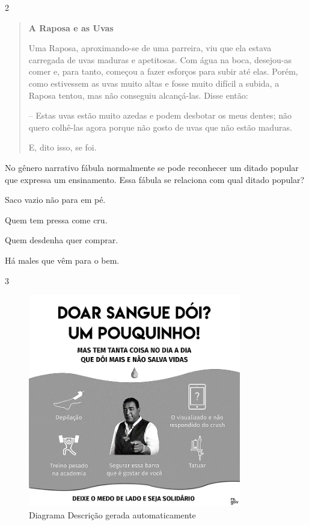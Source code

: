 \num{2}

\begin{quote}
\textbf{A Raposa e as Uvas}

Uma Raposa, aproximando-se de uma parreira, viu que ela estava carregada
de uvas maduras e apetitosas. Com água na boca, desejou-as comer e, para
tanto, começou a fazer esforços para subir até elas. Porém, como
estivessem as uvas muito altas e fosse muito difícil a subida, a Raposa
tentou, mas não conseguiu alcançá-las. Disse então:

-- Estas uvas estão muito azedas e podem desbotar os meus dentes; não
quero colhê-las agora porque não gosto de uvas que não estão maduras.

E, dito isso, se foi.
\end{quote}


No gênero narrativo fábula normalmente se pode reconhecer um ditado
popular que expressa um ensinamento. Essa fábula se relaciona com qual
ditado popular?

\begin{escolha}
\item Saco vazio não para em pé.

\item Quem tem pressa come cru.

\item Quem desdenha quer comprar.

\item Há males que vêm para o bem.
\end{escolha}

\num{3}

\begin{figure}
\centering
\includegraphics[width=3.65556in,height=3.65556in]{./imgSAEB_8_POR/media/image38.png}
\caption{Diagrama Descrição gerada automaticamente}
\end{figure}

